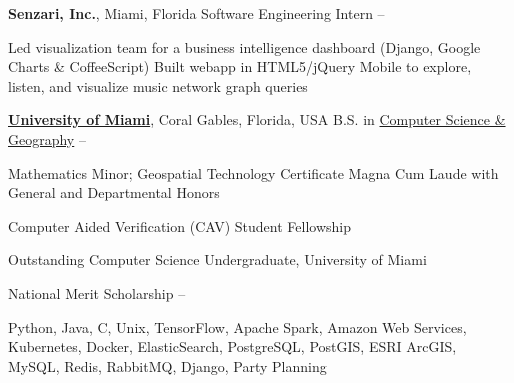 \documentclass[letterpaper,MMMyyyy,nonstopmode]{simpleresumecv}
\begin{document}
\begin{Body}
\Entry
\textbf{Senzari, Inc.}, Miami, Florida
\Gap
\BulletItem
Software Engineering Intern
\hfill
{} -- 
\begin{Detail}
\SubBulletItem Led visualization team for a business intelligence dashboard (Django, Google Charts \& CoffeeScript)
\SubBulletItem Built webapp in HTML5/jQuery Mobile to explore, listen, and visualize music network graph queries
\end{Detail}



\Entry
\href{http://welcome.miami.edu/}{\textbf{University of Miami}},
Coral Gables, Florida, USA
\Gap
\BulletItem
B.S. in \href{http://www.as.miami.edu/csc/}{Computer Science \& Geography}
\hfill
{} -- 
\begin{Detail}
\SubBulletItem Mathematics Minor; Geospatial Technology Certificate
\SubBulletItem Magna Cum Laude with General and Departmental Honors
\end{Detail}



\Gap
\BulletItem Computer Aided Verification (CAV) Student Fellowship
\hfill
{}

\Gap
\BulletItem Outstanding Computer Science Undergraduate, University of Miami
\hfill
{}

\Gap
\BulletItem National Merit Scholarship
\hfill
{} -- 


\Entry Python, Java, C, Unix, TensorFlow, Apache Spark, Amazon Web Services, Kubernetes, Docker, ElasticSearch, PostgreSQL, PostGIS, ESRI ArcGIS, MySQL, Redis, RabbitMQ, Django, Party Planning

\end{Body}
\end{document}
